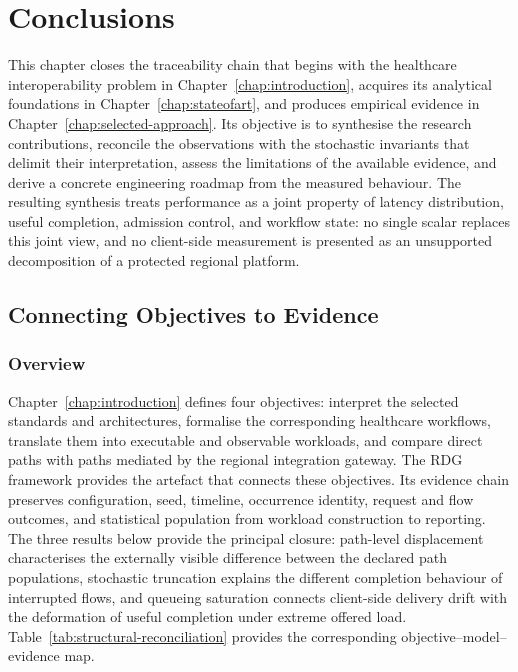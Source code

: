 \chapter{Conclusions}
\label{chap:conclusions}

\begingroup
\setlength{\emergencystretch}{2em}

\noindent This chapter closes the traceability chain that begins with the healthcare
interoperability problem in Chapter~\ref{chap:introduction}, acquires its
analytical foundations in Chapter~\ref{chap:stateofart}, and produces empirical
evidence in Chapter~\ref{chap:selected-approach}. Its objective is to synthesise
the research contributions, reconcile the observations with the stochastic
invariants that delimit their interpretation, assess the limitations of the
available evidence, and derive a concrete engineering roadmap from the measured
behaviour. The resulting synthesis treats performance as a joint property of
latency distribution, useful completion, admission control, and workflow state:
no single scalar replaces this joint view, and no client-side measurement is
presented as an unsupported decomposition of a protected regional platform.

\section{Connecting Objectives to Evidence}
\label{sec:conclusions-objectives-evidence}
\subsection{Overview}
\noindent Chapter~\ref{chap:introduction} defines four objectives: interpret the
selected standards and architectures, formalise the corresponding healthcare
workflows, translate them into executable and observable workloads, and compare
direct paths with paths mediated by the regional integration gateway. The RDG
framework provides the artefact that connects these objectives. Its evidence chain preserves
configuration, seed, timeline, occurrence identity, request and flow outcomes,
and statistical population from workload construction to reporting. The three
results below provide the principal closure: path-level displacement
characterises the externally visible difference between the declared path
populations, stochastic truncation explains the different completion behaviour
of interrupted flows, and queueing saturation connects client-side delivery
drift with the deformation of useful completion under extreme offered load.
Table~\ref{tab:structural-reconciliation} provides the corresponding
objective--model--evidence map.

